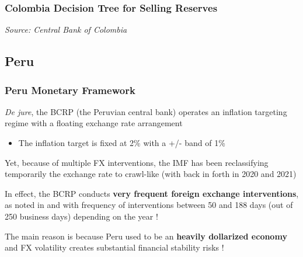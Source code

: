 \documentclass{beamer}
\newenvironment{wideitemize}{\itemize\addtolength{\itemsep}{10pt}}{\enditemize}
\begin{document}
\begin{frame}
\frametitle{Colombia Decision Tree for Selling Reserves}
\medskip
\emph{Source: Central Bank of Colombia}
\end{frame}


\subsection{Peru}

\begin{frame}
  \frametitle{Peru Monetary Framework}
  \begin{wideitemize}
  \item \emph{De jure}, the BCRP (the Peruvian central bank) operates an inflation targeting regime with a floating exchange rate arrangement
    \begin{itemize}
    \item The inflation target is fixed at 2\% with a +/- band of 1\%
    \end{itemize}
  \item Yet, because of multiple FX interventions, the IMF has been reclassifying temporarily the exchange rate to crawl-like (with back in forth in 2020 and 2021)
  \item In effect, the BCRP conducts \textbf{very frequent foreign exchange interventions}, as noted in \href{https://www.bis.org/publ/bppdf/bispap104q.pdf}{} and \href{https://www.elibrary.imf.org/downloadpdf/book/9781484375686/ch012.pdf}{} with frequency of interventions between 50 and 188 days (out of 250 business days) depending on the year !
 \item The main reason is because Peru used to be an \textbf{heavily dollarized economy} and FX volatility creates substantial financial stability risks !
  \end{wideitemize}  
\end{frame}
\end{document}
